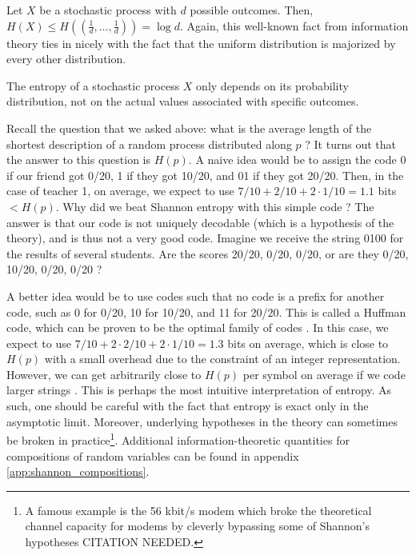 \begin{remark}
    Let $X$ be a stochastic process with $d$ possible outcomes. Then, $H(X) \leq H\left(\left(\frac{1}{d}, \dots, \frac{1}{d}\right)\right) = \log d$. Again, this well-known fact from information theory ties in nicely with the fact that the uniform distribution is majorized by every other distribution.
\end{remark}

\begin{remark}
    The entropy of a stochastic process $X$ only depends on its probability distribution, not on the actual values associated with specific outcomes.
\end{remark}

Recall the question that we asked above: what is the average length of the shortest description of a random process distributed along $p$ ? It turns out that the answer to this question is $H(p)$. A naive idea would be to assign the code 0 if our friend got 0/20, 1 if they got 10/20, and 01 if they got 20/20. Then, in the case of teacher 1, on average, we expect to use $7/10 + 2/10 + 2 \cdot 1/10 = 1.1$ bits $< H(p)$. Why did we beat Shannon entropy with this simple code ? The answer is that our code is not uniquely decodable (which is a hypothesis of the theory), and is thus not a very good code. Imagine we receive the string 0100 for the results of several students. Are the scores 20/20, 0/20, 0/20, or are they 0/20, 10/20, 0/20, 0/20 ?

A better idea would be to use codes such that no code is a prefix for another code, such as 0 for 0/20, 10 for 10/20, and 11 for 20/20. This is called a Huffman code, which can be proven to be the optimal family of codes \cite[p. 123]{cover_elements_2006}. In this case, we expect to use $7/10 + 2 \cdot 2/10 + 2 \cdot 1/10 = 1.3$ bits on average, which is close to $H(p)$ with a small overhead due to the constraint of an integer representation. However, we can get arbitrarily close to $H(p)$ per symbol on average if we code larger strings \cite[p. 114]{cover_elements_2006}. This is perhaps the most intuitive interpretation of entropy. As such, one should be careful with the fact that entropy is exact only in the asymptotic limit. Moreover, underlying hypotheses in the theory can sometimes be broken in practice\footnote{A famous example is the 56 kbit/s modem which broke the theoretical channel capacity for modems by cleverly bypassing some of Shannon's hypotheses CITATION NEEDED.}. Additional information-theoretic quantities for compositions of random variables can be found in appendix \ref{app:shannon_compositions}. %


